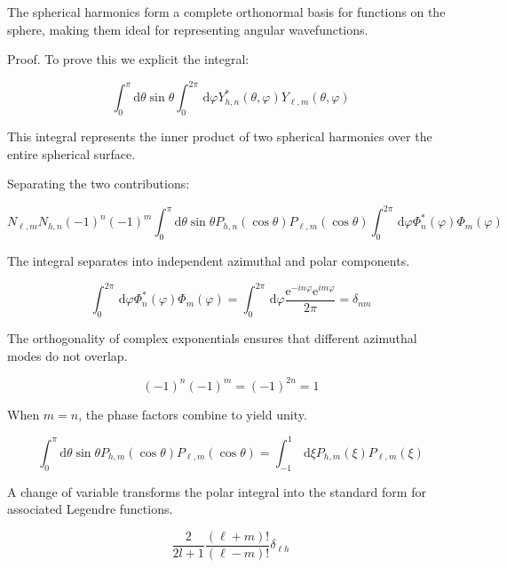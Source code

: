 \documentclass[italian]{HKNdocument}
\begin{document}
The spherical harmonics form a complete orthonormal basis for functions on the sphere, making them ideal for representing angular wavefunctions.

Proof. To prove this we explicit the integral:

\begin{equation}
\int_{0}^{\pi} \mathrm{d} \theta \sin \theta \int_{0}^{2 \pi} \, \mathrm{d} \varphi Y_{h, n}^{*}(\theta, \varphi) Y_{\ell, m}(\theta, \varphi)
\end{equation}

This integral represents the inner product of two spherical harmonics over the entire spherical surface.

Separating the two contributions:

\begin{equation}
N_{\ell, m} N_{h, n}(-1)^{n}(-1)^{m} \int_{0}^{\pi} \mathrm{d} \theta \sin \theta P_{h, n}(\cos \theta) P_{\ell, m}(\cos \theta) \int_{0}^{2 \pi} \, \mathrm{d} \varphi \Phi_{n}^{*}(\varphi) \Phi_{m}(\varphi)
\end{equation}

The integral separates into independent azimuthal and polar components.

\begin{equation}
\int_{0}^{2 \pi} \, \mathrm{d} \varphi \Phi_{n}^{*}(\varphi) \Phi_{m}(\varphi)=\int_{0}^{2 \pi} \, \mathrm{d} \varphi \frac{\mathrm{e}^{-i n \varphi} \mathrm{e}^{i m \varphi}}{2 \pi}=\delta_{n m}
\end{equation}

The orthogonality of complex exponentials ensures that different azimuthal modes do not overlap.

\begin{equation}
(-1)^{n}(-1)^{m}=(-1)^{2 n}=1
\end{equation}

When $m=n$, the phase factors combine to yield unity.

\begin{equation}
\int_{0}^{\pi} \mathrm{d} \theta \sin \theta P_{h, m}(\cos \theta) P_{\ell, m}(\cos \theta)=\int_{-1}^{1} \, \mathrm{d} \xi P_{h, m}(\xi) P_{\ell, m}(\xi)
\end{equation}

A change of variable transforms the polar integral into the standard form for associated Legendre functions.

\begin{equation}
\frac{2}{2 l+1} \frac{(\ell+m)!}{(\ell-m)!} \delta_{\ell h}
\end{equation}
\end{document}
